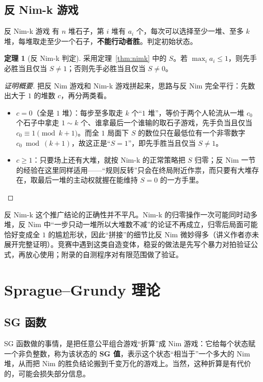 \documentclass[UTF8,a4paper,11pt,oneside,openany,fontset=fandol]{ctexbook}
\theoremstyle{definition}
\newtheorem{theorem}[definition]{定理}
\begin{document}
\section{反 Nim-k 游戏}
\begin{problem}{反 Nim-k 游戏}
有 $n$ 堆石子，第 $i$ 堆有 $a_i$ 个，每次可以选择至少一堆、至多 $k$ 堆，每堆取走至少一个石子，\textbf{不能行动者胜}。判定初始状态。
\end{problem}

\begin{theorem}[反 Nim-k 判定]\label{thm:antinimk}
采用定理~\ref{thm:nimk} 中的 $S$。若 $\max_i a_i\le1$，则先手必胜当且仅当 $S\ne1$；否则先手必胜当且仅当 $S\ne0$。
\end{theorem}
\begin{proof}[证明概要]
把反 Nim 游戏和 Nim-k 游戏拼起来，思路与反 Nim 完全平行：先数出大于 $1$ 的堆数 $c$，再分两类看。
\begin{itemize}
\item $c=0$（全是 $1$ 堆）：每步至多取走 $k$ 个“$1$ 堆”，等价于两个人轮流从一堆 $c_0$ 个石子中拿走 $1\sim k$ 个、谁拿最后一个谁输的取石子游戏，先手负当且仅当 $c_0\equiv1\pmod{k+1}$。而全 $1$ 局面下 $S$ 的数位只在最低位有一个非零数字 $c_0\bmod(k+1)$，故这正是“$S=1$”，即先手胜当且仅当 $S\ne1$。
\item $c\ge1$：只要场上还有大堆，就按 Nim-k 的正常策略把 $S$ 归零；反 Nim 一节的经验在这里同样适用——“规则反转”只会在终局附近作祟，而只要有大堆存在，取最后一堆的主动权就握在能维持 $S=0$ 的一方手里。
\end{itemize}
\end{proof}

\begin{pitfall}[自造变体先对拍]
反 Nim-k 这个推广结论的正确性并不平凡。Nim-k 的归零操作一次可能同时动多堆，反 Nim 中“一步只动一堆所以大堆数不减”的论证不再成立，归零后局面可能恰好变成全 $1$ 的尴尬形状，因此“拼接”的细节比反 Nim 微妙得多（讲义作者亦未展开完整证明）。竞赛中遇到这类自造变体，稳妥的做法是先写个暴力对拍验证公式，再放心使用；附录的自测程序对有限范围做了验证。
\end{pitfall}

\chapter{Sprague--Grundy 理论}
\section{SG 函数}
SG 函数做的事情，是把任意公平组合游戏“折算”成 Nim 游戏：它给每个状态赋一个非负整数，称为该状态的 \textbf{SG 值}，表示这个状态“相当于”一个多大的 Nim 堆，从而把 Nim 的胜负结论搬到千变万化的游戏上。当然，这种折算是有代价的，可能会损失部分信息。
\end{document}

